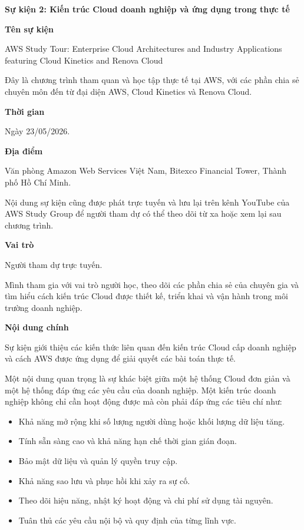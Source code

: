 \vspace{0.5em}\noindent\textbf{Sự kiện 2: Kiến trúc Cloud doanh nghiệp và ứng dụng trong thực
tế}\par

\vspace{0.5em}\noindent\textbf{Tên sự kiện}\par

AWS Study Tour: Enterprise Cloud Architectures and Industry Applications
featuring Cloud Kinetics and Renova Cloud

Đây là chương trình tham quan và học tập thực tế tại AWS, với các phần
chia sẻ chuyên môn đến từ đại diện AWS, Cloud Kinetics và Renova Cloud.

\vspace{0.5em}\noindent\textbf{Thời gian}\par

Ngày 23/05/2026.

\vspace{0.5em}\noindent\textbf{Địa điểm}\par

Văn phòng Amazon Web Services Việt Nam, Bitexco Financial Tower, Thành
phố Hồ Chí Minh.

Nội dung sự kiện cũng được phát trực tuyến và lưu lại trên kênh YouTube
của AWS Study Group để người tham dự có thể theo dõi từ xa hoặc xem lại
sau chương trình.

\vspace{0.5em}\noindent\textbf{Vai trò}\par

Người tham dự trực tuyến.

Mình tham gia với vai trò người học, theo dõi các phần chia sẻ của
chuyên gia và tìm hiểu cách kiến trúc Cloud được thiết kế, triển khai và
vận hành trong môi trường doanh nghiệp.

\vspace{0.5em}\noindent\textbf{Nội dung chính}\par

Sự kiện giới thiệu các kiến thức liên quan đến kiến trúc Cloud cấp doanh
nghiệp và cách AWS được ứng dụng để giải quyết các bài toán thực tế.

Một nội dung quan trọng là sự khác biệt giữa một hệ thống Cloud đơn giản
và một hệ thống đáp ứng các yêu cầu của doanh nghiệp. Một kiến trúc
doanh nghiệp không chỉ cần hoạt động được mà còn phải đáp ứng các tiêu
chí như:

\begin{itemize}
\tightlist
\item
  Khả năng mở rộng khi số lượng người dùng hoặc khối lượng dữ liệu tăng.
\item
  Tính sẵn sàng cao và khả năng hạn chế thời gian gián đoạn.
\item
  Bảo mật dữ liệu và quản lý quyền truy cập.
\item
  Khả năng sao lưu và phục hồi khi xảy ra sự cố.
\item
  Theo dõi hiệu năng, nhật ký hoạt động và chi phí sử dụng tài nguyên.
\item
  Tuân thủ các yêu cầu nội bộ và quy định của từng lĩnh vực.
\end{itemize}

